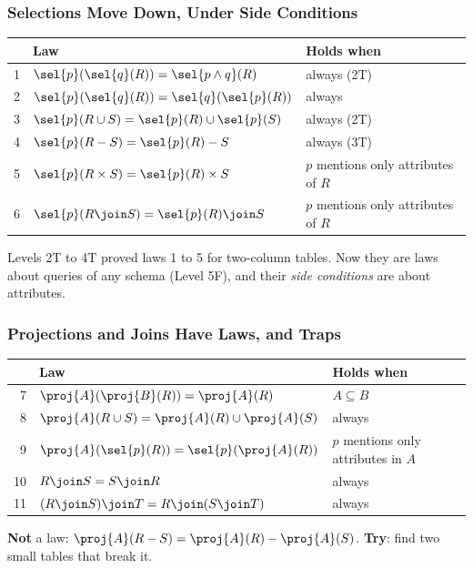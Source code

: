 \documentclass{ltx-talk}
\begin{document}
\begin{frame}
  \frametitle{Selections Move Down, Under Side Conditions}
  {\centering\renewcommand{}
    {\headerrow\begin{tabular}{@{}r@{\quad}l@{\qquad}l@{}}
      \hline
      & \textbf{Law} & \textbf{Holds when} \\ \hline
      1 & $\sel{p}(\sel{q}(R)) = \sel{p \wedge q}(R)$ & always (2T) \\
      2 & $\sel{p}(\sel{q}(R)) = \sel{q}(\sel{p}(R))$ & always \\
      3 & $\sel{p}(R \cup S) = \sel{p}(R) \cup \sel{p}(S)$ & always (2T) \\
      4 & $\sel{p}(R - S) = \sel{p}(R) - S$ & always (3T) \\
      5 & $\sel{p}(R \times S) = \sel{p}(R) \times S$ & $p$ mentions only
        attributes of $R$ \\
      6 & $\sel{p}(R \join S) = \sel{p}(R) \join S$ & $p$ mentions only
        attributes of $R$ \\ \hline
    \end{tabular}}\par}
  \medskip
  Levels 2T to 4T proved laws 1 to 5 for two-column tables. Now they are
  laws about queries of any schema (Level 5F), and their \emph{side
  conditions} are about attributes.
\end{frame}

\begin{frame}
  \frametitle{Projections and Joins Have Laws, and Traps}
  {\centering\renewcommand{}
    {\headerrow\begin{tabular}{@{}r@{\quad}l@{\qquad}l@{}}
      \hline
      & \textbf{Law} & \textbf{Holds when} \\ \hline
      7 & $\proj{A}(\proj{B}(R)) = \proj{A}(R)$ & $A \subseteq B$ \\
      8 & $\proj{A}(R \cup S) = \proj{A}(R) \cup \proj{A}(S)$ & always \\
      9 & $\proj{A}(\sel{p}(R)) = \sel{p}(\proj{A}(R))$ & $p$ mentions
        only attributes in $A$ \\
      10 & $R \join S = S \join R$ & always \\
      11 & $(R \join S) \join T = R \join (S \join T)$ & always \\ \hline
    \end{tabular}}\par}
  \medskip
  \textbf{Not} a law: $\proj{A}(R - S) = \proj{A}(R) - \proj{A}(S)$.
  \textbf{Try}: find two small tables that break it.
\end{frame}
\end{document}

